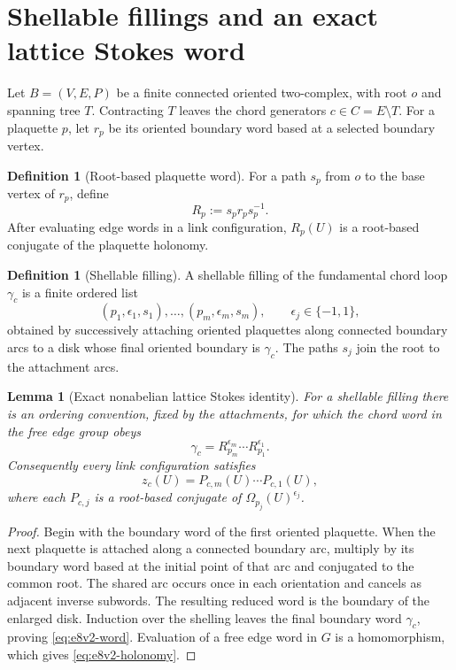 \documentclass[11pt,oneside]{book}
\newtheorem{lemma}[theorem]{Lemma}
\theoremstyle{definition}
\newtheorem{definition}[theorem]{Definition}
\theoremstyle{remark}
\begin{document}
\section{Shellable fillings and an exact lattice Stokes word}
\label{sec:e8v2-Stokes}

Let \(B=(V,E,P)\) be a finite connected oriented two-complex, with
root \(o\) and spanning tree \(T\).  Contracting \(T\) leaves the chord
generators \(c\in C=E\setminus T\).  For a plaquette \(p\), let
\(r_p\) be its oriented boundary word based at a selected boundary
vertex.

\begin{definition}[Root-based plaquette word]
\label{def:e8v2-based}
For a path \(s_p\) from \(o\) to the base vertex of \(r_p\), define
\[
 R_p:=s_pr_ps_p^{-1}.                                \label{eq:e8v2-Rp}
\]
After evaluating edge words in a link configuration, \(R_p(U)\) is a
root-based conjugate of the plaquette holonomy.
\end{definition}

\begin{definition}[Shellable filling]
\label{def:e8v2-shelling}
A shellable filling of the fundamental chord loop \(\gamma_c\) is a
finite ordered list
\[
 (p_1,\epsilon_1,s_1),\ldots,(p_m,\epsilon_m,s_m),
 \qquad \epsilon_j\in\{-1,1\},                       \label{eq:e8v2-shelling}
\]
obtained by successively attaching oriented plaquettes along connected
boundary arcs to a disk whose final oriented boundary is
\(\gamma_c\).  The paths \(s_j\) join the root to the attachment arcs.
\end{definition}

\begin{lemma}[Exact nonabelian lattice Stokes identity]
\label{lem:e8v2-Stokes}
For a shellable filling there is an ordering convention, fixed by the
attachments, for which the chord word in the free edge group obeys
\[
 \gamma_c
 =
 R_{p_m}^{\epsilon_m}\cdots R_{p_1}^{\epsilon_1}.
                                                        \label{eq:e8v2-word}
\]
Consequently every link configuration satisfies
\[
 z_c(U)
 =
 P_{c,m}(U)\cdots P_{c,1}(U),                        \label{eq:e8v2-holonomy}
\]
where each \(P_{c,j}\) is a root-based conjugate of
\(\Omega_{p_j}(U)^{\epsilon_j}\).
\end{lemma}

\begin{proof}
Begin with the boundary word of the first oriented plaquette.  When
the next plaquette is attached along a connected boundary arc, multiply
by its boundary word based at the initial point of that arc and
conjugated to the common root.  The shared arc occurs once in each
orientation and cancels as adjacent inverse subwords.  The resulting
reduced word is the boundary of the enlarged disk.  Induction over the
shelling leaves the final boundary word \(\gamma_c\), proving
\eqref{eq:e8v2-word}.  Evaluation of a free edge word in \(G\) is a
homomorphism, which gives \eqref{eq:e8v2-holonomy}.
\end{proof}
\end{document}
